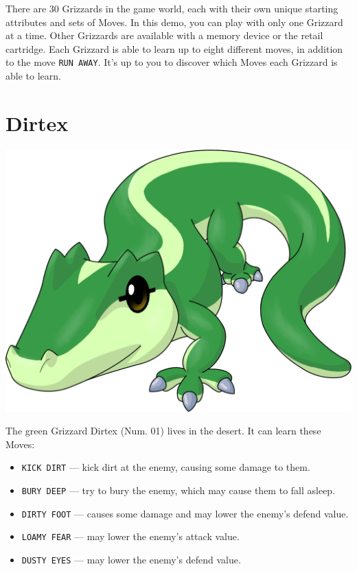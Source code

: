 \documentclass[10pt,twocolumn,openany,article]{memoir}
\begin{document}
There are  30 Grizzards in  the game world,  each with their  own unique
starting attributes and  sets of Moves. \ifdefined\NOSAVE  In this demo,
you  can play  with only  one Grizzard  at a  time. Other  Grizzards are
available  with  a memory  device  or  the  retail cartridge.  \fi  Each
Grizzard is able  to learn up to  eight different moves, in  addition to the
move \texttt{RUN  AWAY}. It's  up to  you to  discover which  Moves each
Grizzard is able to learn.

\ifdefined\ATARIAGESAVE
\vfill
\fi

\ifdefined\DEMO\else

\pagebreak

\section{Dirtex}

\begin{center}
  \includegraphics[width=\columnwidth]{../Manual/Dirtex.png}
\end{center}

The green  Grizzard Dirtex (Num. 01)  lives in the desert.  It can learn
these Moves:

\begin{itemize}
\item \texttt{KICK DIRT} --- kick dirt at the enemy, causing some damage
  to them.
\item \texttt{BURY DEEP} --- try to bury the enemy, which may cause them
  to fall asleep.
\item  \texttt{DIRTY FOOT}  --- causes  some  damage and  may lower  the
  enemy's defend value.
\item \texttt{LOAMY FEAR} --- may lower the enemy's attack value.
\item \texttt{DUSTY EYES} --- may lower the enemy's defend value.
\end{itemize}
\end{document}
